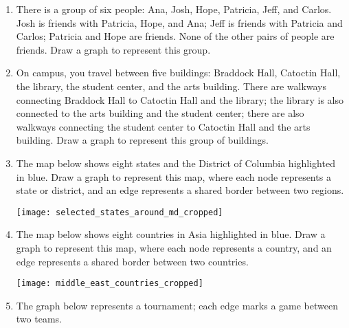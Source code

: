 \begin{enumerate}
\item There is a group of six people: Ana, Josh, Hope, Patricia, Jeff, and Carlos.  Josh is friends with Patricia, Hope, and Ana; Jeff is friends with Patricia and Carlos; Patricia and Hope are friends.  None of the other pairs of people are friends.  Draw a graph to represent this group.

\item On campus, you travel between five buildings: Braddock Hall, Catoctin Hall, the library, the student center, and the arts building.  There are walkways connecting Braddock Hall to Catoctin Hall and the library; the library is also connected to the arts building and the student center; there are also walkways connecting the student center to Catoctin Hall and the arts building.  Draw a graph to represent this group of buildings.

\item The map below shows eight states and the District of Columbia highlighted in blue.  Draw a graph to represent this map, where each node represents a state or district, and an edge represents a shared border between two regions.
\begin{center}
\texttt{[image: selected\_states\_around\_md\_cropped]}
\end{center}

\item The map below shows eight countries in Asia highlighted in blue.  Draw a graph to represent this map, where each node represents a country, and an edge represents a shared border between two countries.
\begin{center}
\texttt{[image: middle\_east\_countries\_cropped]}
\end{center}

\item The graph below represents a tournament; each edge marks a game between two teams.
\begin{center}
\end{center}
\end{enumerate}

